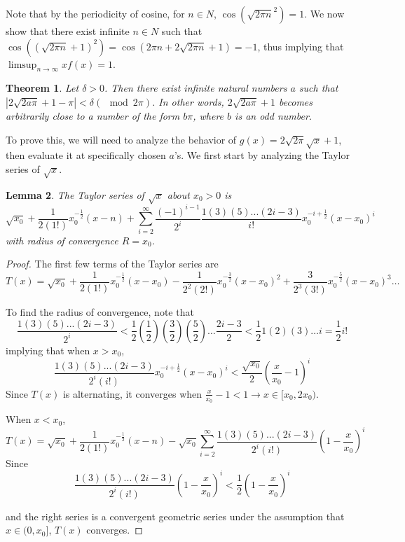 \documentclass{amsart}
\newtheorem{theorem}{Theorem}
\newtheorem{lemma}[theorem]{Lemma}
\begin{document}
Note that by the periodicity of cosine, for $n \in N$, $\cos(\sqrt{2\pi n}^2) = 1$. We now show that there exist infinite $n \in N$ such that $\cos((\sqrt{2\pi n}+1)^2) = \cos(2\pi n + 2\sqrt{2 \pi n} + 1) = -1$, thus implying that $\limsup_{n\rightarrow\infty} xf(x) = 1$.

\begin{theorem}
\label{NearCosine}
Let $\delta > 0$. Then there exist infinite natural numbers $a$ such that $|2\sqrt{2a\pi} + 1 - \pi| < \delta \left(\mod 2\pi \right)$. In other words, $2\sqrt{2a\pi} + 1$ becomes arbitrarily close to a number of the form $b\pi$, where $b$ is an odd number.
\end{theorem}

To prove this, we will need to analyze the behavior of $g(x) = 2\sqrt{2\pi}\sqrt{x} + 1$, then evaluate it at specifically chosen $a$'s. We first start by analyzing the Taylor series of $\sqrt{x}$.

\begin{lemma}
\label{SquareRootTaylorSeries}
The Taylor series of $\sqrt{x}$ about $x_0>0$ is
\[
\sqrt{x_0} + \frac{1}{2(1!)} x_0^{-\frac{1}{2}}(x-n) + \sum_{i=2}^{\infty} \frac{(-1)^{i-1}}{2^i} \frac{1(3)(5)...(2i-3)}{i!} x_0^{-i + \frac{1}{2}}(x-x_0)^i
\]
with radius of convergence $R = x_0$.
\end{lemma}

\begin{proof}
The first few terms of the Taylor series are
\[
T(x) = \sqrt{x_0} + \frac{1}{2(1!)} x_0^{-\frac{1}{2}}(x-x_0)
- \frac{1}{2^2(2!)} x_0^{-\frac{3}{2}}(x-x_0)^2
+ \frac{3}{2^3(3!)} x_0^{-\frac{5}{2}}(x-x_0)^3 \dots
\]

To find the radius of convergence, note that
\[
\frac{1(3)(5)...(2i-3)}{2^i}
< \frac{1}{2} \left(\frac{1}{2}\right)
\left(\frac{3}{2}\right)\left(\frac{5}{2}\right)\dots \frac{2i-3}{2} 
< \frac{1}{2} 1(2)(3)\dots i
= \frac{1}{2} i!
\]
implying that when $x > x_0$,
\[
\frac{1(3)(5)...(2i-3)}{2^i(i!)} x_0^{-i + \frac{1}{2}}(x-x_0)^i
< \frac{\sqrt{x_0}}{2}\left(\frac{x}{x_0}-1\right)^i
\]
Since $T(x)$ is alternating, it converges when $\frac{x}{x_0} - 1 < 1 \rightarrow x \in [x_0, 2x_0)$.

When $x < x_0$,
\[
T(x) = \sqrt{x_0} + \frac{1}{2(1!)} x_0^{-\frac{1}{2}}(x-n) 
- \sqrt{x_0}\sum_{i=2}^{\infty} \frac{1(3)(5)...(2i-3)}{2^i(i!)} \left(1 - \frac{x}{x_0}\right)^i
\]
Since
\[
\frac{1(3)(5)...(2i-3)}{2^i(i!)} \left(1 - \frac{x}{x_0}\right)^i
< \frac{1}{2}\left(1 - \frac{x}{x_0}\right)^i
\]

and the right series is a convergent geometric series under the assumption that $x \in (0, x_0]$, $T(x)$ converges.

\end{proof}
\end{document}
